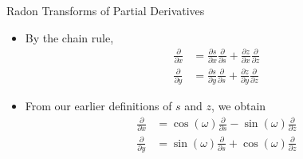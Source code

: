 \documentclass{beamer}
\begin{document}
\begin{frame}{Radon Transforms of Partial Derivatives}
	\begin{itemize}
		\item By the chain rule,
		\begin{align*}
		\frac{\partial}{\partial x} & = \frac{\partial s}{\partial x} \frac{\partial}{\partial s} + \frac{\partial z}{\partial x} \frac{\partial}{\partial z} \\
		\frac{\partial}{\partial y} & = \frac{\partial s}{\partial y} \frac{\partial}{\partial s} + \frac{\partial z}{\partial y} \frac{\partial}{\partial z}
		\end{align*}
		\item
		From our earlier definitions of $s$ and $z$, we obtain
		\begin{align*}
		    \frac{\partial}{\partial x} & = \cos (\omega) \frac{\partial}{\partial s} -\sin (\omega) \frac{\partial}{\partial z} \\
		    \frac{\partial}{\partial y} & = \sin (\omega) \frac{\partial}{\partial s} + \cos (\omega) \frac{\partial}{\partial z}
		\end{align*}
		
	\end{itemize}
\end{frame}

\end{document}
